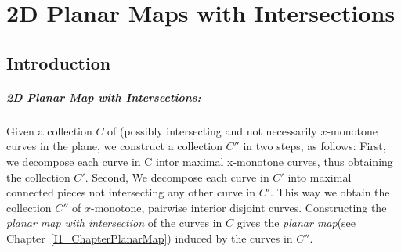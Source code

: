
%
%
%
%
%
%
%
%
%
%
%
\chapter{2D Planar Maps with Intersections} \label{I1_ChapterPmwx}

\section{Introduction}

\paragraph{2D Planar Map with Intersections:} 
  Given a collection $C$ of (possibly intersecting and not necessarily
  $x$-monotone curves in the plane, we construct a collection $C''$ in
  two steps, as follows: First, we decompose each curve in C intor
  maximal x-monotone curves, thus obtaining the collection
  $C'$. Second, We decompose each curve in $C'$ into maximal connected
  pieces not intersecting any other curve in $C'$.  This way we obtain
  the collection $C''$ of $x$-monotone, pairwise interior disjoint
  curves.  Constructing the {\it planar map with intersection} of the
  curves in $C$ gives the {\it planar map}(see
  Chapter~\ref{I1_ChapterPlanarMap}) induced by the curves in $C''$.

